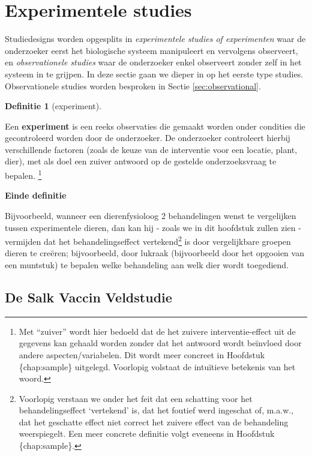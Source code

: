 \documentclass[
  12pt,dutch,coursenotes]{book}
\theoremstyle{definition}
\newtheorem{definition}{Definitie}[chapter]
\theoremstyle{definition}
\theoremstyle{definition}
\theoremstyle{remark}
\begin{document}
\hypertarget{experimentele-studies}{%
\section{Experimentele studies}\label{experimentele-studies}}

Studiedesigns worden opgesplits in \emph{experimentele studies of experimenten} waar de onderzoeker eerst het biologische systeem manipuleert en vervolgens observeert, en \emph{observationele studies} waar de onderzoeker enkel observeert zonder zelf in het systeem in te grijpen. In deze sectie gaan we dieper in op het eerste type studies. Observationele studies worden besproken in Sectie \ref{sec:observational}.

\begin{definition}[experiment]
\protect\hypertarget{def:unnamed-chunk-64}{}{\label{def:unnamed-chunk-64} \iffalse (experiment) \fi{} }
\end{definition}
Een \textbf{experiment} is een reeks observaties die gemaakt worden onder
condities die gecontroleerd worden door de onderzoeker. De onderzoeker
controleert hierbij verschillende factoren (zoals de keuze van de
interventie voor een locatie, plant, dier), met als doel een zuiver antwoord op de gestelde onderzoeksvraag te bepalen.
\footnote{Met ``zuiver'' wordt hier bedoeld dat de het zuivere interventie-effect uit de gegevens
  kan gehaald worden zonder dat het antwoord wordt beïnvloed door andere aspecten/variabelen. Dit wordt meer concreet in Hoofdstuk \{chap:sample\}
  uitgelegd. Voorlopig volstaat de intuïtieve betekenis van het woord.}

\textbf{Einde definitie}

Bijvoorbeeld, wanneer een dierenfysioloog 2 behandelingen wenst te vergelijken tussen experimentele dieren,
dan kan hij - zoals we in dit hoofdstuk zullen zien - vermijden dat het
behandelingseffect vertekend\footnote{ Voorlopig verstaan we onder het feit dat een schatting voor het
  behandelingseffect `vertekend' is, dat het foutief werd ingeschat of, m.a.w., dat het geschatte effect niet correct het zuivere effect van de behandeling weerspiegelt. Een meer concrete definitie volgt eveneens in
  Hoofdstuk \{chap:sample\}.} is door vergelijkbare groepen dieren te creëren;
bijvoorbeeld, door lukraak (bijvoorbeeld door
het opgooien van een muntstuk) te bepalen welke behandeling aan welk
dier wordt toegediend.

\hypertarget{de-salk-vaccin-veldstudie}{%
\subsection{De Salk Vaccin Veldstudie}\label{de-salk-vaccin-veldstudie}}
\end{document}
